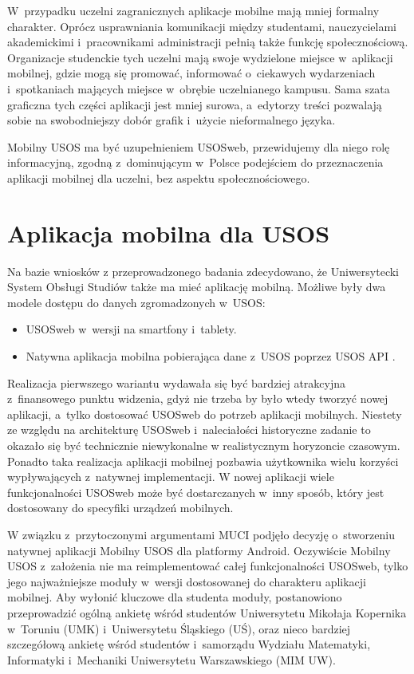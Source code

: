 \documentclass{pracamgr}
\begin{document}
W~przypadku uczelni zagranicznych aplikacje mobilne mają mniej formalny
charakter. Oprócz usprawniania komunikacji między studentami, nauczycielami
akademickimi i~pracownikami administracji pełnią także funkcję społecznościową.
Organizacje studenckie tych uczelni mają swoje wydzielone miejsce w~aplikacji
mobilnej, gdzie mogą się promować, informować o~ciekawych wydarzeniach i~spotkaniach
mających miejsce w~obrębie uczelnianego kampusu. Sama szata graficzna tych części
aplikacji jest mniej surowa, a~edytorzy treści pozwalają sobie na
swobodniejszy dobór grafik i~użycie nieformalnego języka. 

Mobilny USOS ma być uzupełnieniem USOSweb, przewidujemy dla niego rolę informacyjną,
zgodną z~dominującym w~Polsce podejściem do przeznaczenia aplikacji mobilnej dla uczelni,
bez aspektu społecznościowego.

\section{Aplikacja mobilna dla USOS}

Na bazie wniosków z przeprowadzonego badania zdecydowano, że Uniwersytecki
System Obsługi Studiów także ma mieć aplikację mobilną. Możliwe były dwa
modele dostępu do danych zgromadzonych w~USOS:

\begin{itemize}
	\item USOSweb w~wersji na smartfony i~tablety.
	\item Natywna aplikacja mobilna pobierająca dane z~USOS poprzez USOS API \cite{usosapi}.
\end{itemize}

Realizacja pierwszego wariantu wydawała się być bardziej atrakcyjna z~finansowego
punktu widzenia, gdyż nie trzeba by było wtedy tworzyć nowej aplikacji, a~tylko
dostosować USOSweb do potrzeb aplikacji mobilnych. Niestety ze względu na architekturę
USOSweb i~naleciałości historyczne zadanie to okazało się być technicznie niewykonalne
w realistycznym horyzoncie czasowym. Ponadto taka realizacja aplikacji mobilnej
pozbawia użytkownika wielu korzyści wypływających z~natywnej implementacji.
W nowej aplikacji wiele funkcjonalności USOSweb może być dostarczanych w~inny
sposób, który jest dostosowany do specyfiki urządzeń mobilnych.

W związku z~przytoczonymi argumentami MUCI podjęło decyzję o~stworzeniu natywnej
aplikacji Mobilny USOS dla platformy Android. Oczywiście Mobilny USOS z~założenia
nie ma reimplementować całej funkcjonalności USOSweb, tylko jego najważniejsze
moduły w~wersji dostosowanej do charakteru aplikacji mobilnej.
Aby wyłonić kluczowe dla studenta moduły, postanowiono przeprowadzić
ogólną ankietę wśród studentów Uniwersytetu Mikołaja Kopernika w~Toruniu (UMK) i~Uniwersytetu
Śląskiego (UŚ), oraz nieco bardziej szczegółową ankietę wśród studentów i~samorządu
Wydziału Matematyki, Informatyki i~Mechaniki Uniwersytetu Warszawskiego (MIM UW).
\end{document}
